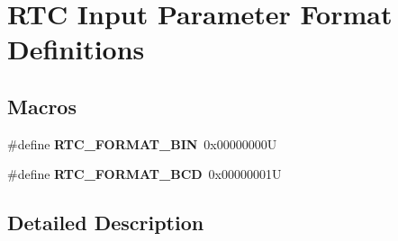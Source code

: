 \hypertarget{group___r_t_c___input__parameter__format__definitions}{}\section{R\+TC Input Parameter Format Definitions}
\label{group___r_t_c___input__parameter__format__definitions}
\subsection*{Macros}
\begin{DoxyCompactItemize}
\item 
\mbox{\label{group___r_t_c___input__parameter__format__definitions_gadf5ce0bf2d5b4814fb3911f63d7ffb17}} 
\#define {\bfseries R\+T\+C\+\_\+\+F\+O\+R\+M\+A\+T\+\_\+\+B\+IN}~0x00000000U
\item 
\mbox{\label{group___r_t_c___input__parameter__format__definitions_ga20d772c2e0ba75287a3655780fd0c39b}} 
\#define {\bfseries R\+T\+C\+\_\+\+F\+O\+R\+M\+A\+T\+\_\+\+B\+CD}~0x00000001U
\end{DoxyCompactItemize}


\subsection{Detailed Description}
